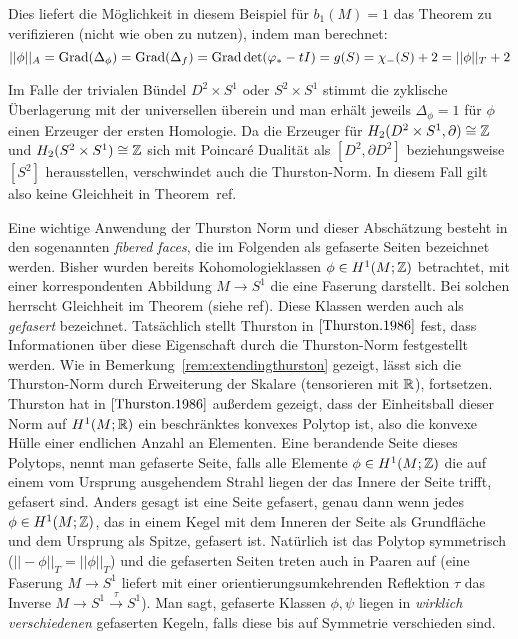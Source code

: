 \begin{bsp}
        Dies liefert die Möglichkeit in diesem Beispiel für $b_1(M)=1$ das Theorem zu verifizieren (nicht wie oben zu nutzen), indem man berechnet: 
        \[
            ||\phi||_A=\operatorname{Grad}(\Delta_\phi)=\operatorname{Grad} (\Delta_f) = \operatorname{Grad} \det (\varphi_*-tI) = g(S) = \chi_-(S) +2 = ||\phi||_T+2
        \]

        Im Falle der trivialen Bündel $D^2\times S^1$ oder $S^2\times S^1$ stimmt die zyklische Überlagerung mit der universellen überein und man erhält jeweils $\Delta_\phi =1$ für $\phi$ einen Erzeuger der ersten Homologie. Da die Erzeuger für $H_2(D^2 \times S^1, \partial)\cong \mathbb{Z}$ und $H_2(S^2\times S^1) \cong \mathbb{Z}$ sich mit Poincaré Dualität als $[D^2,\partial D^2]$ beziehungsweise $[S^2]$ herausstellen, verschwindet auch die Thurston-Norm. In diesem Fall gilt also keine Gleichheit in Theorem~ref. 

    \end{bsp}



    \begin{bsp}
    \label{ex:fiberedfaces}
        Eine wichtige Anwendung der Thurston Norm und dieser Abschätzung besteht in den sogenannten \textit{fibered faces}, die im Folgenden als gefaserte Seiten bezeichnet werden. Bisher wurden bereits Kohomologieklassen $\phi \in H^1(M;\mathbb{Z})$ betrachtet, mit einer korrespondenten Abbildung $M \to S^1$ die eine Faserung darstellt. Bei solchen herrscht Gleichheit im Theorem (siehe ref). Diese Klassen werden auch als \textit{gefasert} bezeichnet. Tatsächlich stellt Thurston in $\cite{Thurston.1986}$ fest, dass Informationen über diese Eigenschaft durch die Thurston-Norm festgestellt werden. Wie in Bemerkung~\ref{rem:extendingthurston} gezeigt, lässt sich die Thurston-Norm durch Erweiterung der Skalare (tensorieren mit $\mathbb{R}$), fortsetzen. Thurston hat in $\cite{Thurston.1986}$ außerdem gezeigt, dass der Einheitsball dieser Norm auf $H^1(M;\mathbb{R})$ ein beschränktes konvexes Polytop ist, also die konvexe Hülle einer endlichen Anzahl an Elementen. Eine berandende Seite dieses Polytops, nennt man gefaserte Seite, falls alle Elemente $\phi \in H^1(M;\mathbb{Z})$ die auf einem vom Ursprung ausgehendem Strahl liegen der das Innere der Seite trifft, gefasert sind. Anders gesagt ist eine Seite gefasert, genau dann wenn jedes $\phi \in H^1(M;\mathbb{Z})$, das in einem Kegel mit dem Inneren der Seite als Grundfläche und dem Ursprung als Spitze, gefasert ist. Natürlich ist das Polytop symmetrisch ($||-\phi||_T=||\phi||_T$) und die gefaserten Seiten treten auch in Paaren auf (eine Faserung $M \to S^1$ liefert mit einer orientierungsumkehrenden Reflektion $\tau$ das Inverse $M \to S^1 \stackrel \tau \to S^1$). Man sagt, gefaserte Klassen $\phi,\psi$ liegen in \textit{wirklich verschiedenen} gefaserten Kegeln, falls diese bis auf Symmetrie verschieden sind. 
    \end{bsp}

